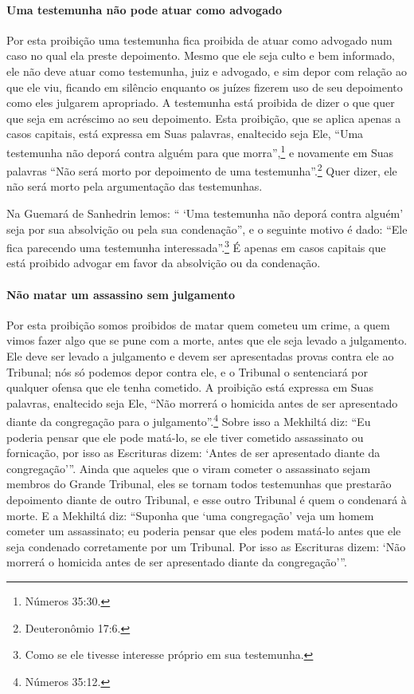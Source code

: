 \paragraph{Uma testemunha não pode atuar como advogado}

Por esta proibição uma testemunha fica proibida de atuar como advogado
num caso no qual ela preste depoimento. Mesmo que ele seja culto e bem
informado, ele não deve atuar como testemunha, juiz e advogado, e sim
depor com relação ao que ele viu, ficando em silêncio enquanto os juízes
fizerem uso de seu depoimento como eles julgarem apropriado. A
testemunha está proibida de dizer o que quer que seja em acréscimo ao
seu depoimento. Esta proibição, que se aplica apenas a casos capitais,
está expressa em Suas palavras, enaltecido seja Ele, ``Uma testemunha
não deporá contra alguém para que morra'',\footnote{Números 35:30.} e novamente
em Suas palavras ``Não será morto por depoimento de uma testemunha''.\footnote{Deuteronômio 17:6.} Quer dizer, ele não será morto pela argumentação
das testemunhas.

Na Guemará de Sanhedrin lemos: `` `Uma testemunha não deporá contra
alguém' seja por sua absolvição ou pela sua condenação'', e o seguinte
motivo é dado: ``Ele fica parecendo uma testemunha
interessada''.\footnote{Como se ele tivesse interesse próprio em sua testemunha.}
É apenas em casos capitais que está proibido advogar em favor da
absolvição ou da condenação.

\paragraph{Não matar um assassino sem julgamento}

Por esta proibição somos proibidos de matar quem cometeu um crime, a
quem vimos fazer algo que se pune com a morte, antes que ele seja levado
a julgamento. Ele deve ser levado a julgamento e devem ser apresentadas
provas contra ele ao Tribunal; nós só podemos depor contra ele, e o
Tribunal o sentenciará por qualquer ofensa que ele tenha cometido. A
proibição está expressa em Suas palavras, enaltecido seja Ele, ``Não
morrerá o homicida antes de ser apresentado diante da congregação para
o julgamento''.\footnote{Números 35:12.} Sobre isso a Mekhiltá diz: ``Eu poderia
pensar que ele pode matá-lo, se ele tiver cometido assassinato ou
fornicação, por isso as Escrituras dizem: `Antes de ser apresentado
diante da congregação'''. Ainda que aqueles que o viram cometer o
assassinato sejam membros do Grande Tribunal, eles se tornam todos
testemunhas que prestarão depoimento diante de outro Tribunal, e esse
outro Tribunal é quem o condenará à morte. E a Mekhiltá diz: ``Suponha
que `uma congregação' veja um homem cometer um assassinato; eu poderia
pensar que eles podem matá-lo antes que ele seja condenado corretamente
por um Tribunal. Por isso as Escrituras dizem: `Não morrerá o homicida
antes de ser apresentado diante da congregação'''.

